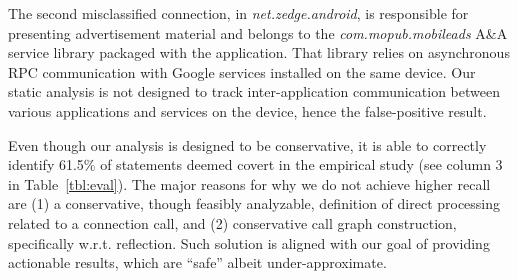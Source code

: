 The second misclassified connection, in \emph{net.zedge.android}, is responsible for presenting advertisement material and belongs to the \emph{com.mopub.mobileads} A\&A service library packaged with the application. 
That library relies on asynchronous RPC communication with Google services 
installed on the same device. Our static analysis is not designed to track inter-application communication between various applications and services on the device, hence the false-positive result.   
 

%

Even though our analysis is designed to be conservative, it is able to correctly identify 
61.5\% of statements deemed covert in the empirical study (see column 3 in Table~\ref{tbl:eval}). 
The major reasons for why we do
not achieve higher recall are (1) a conservative, though feasibly
analyzable, definition of direct processing related to a connection
call, and (2) conservative call graph construction, specifically
w.r.t. reflection.
Such solution is aligned with our goal of providing actionable results, which are ``safe'' albeit under-approximate.  

